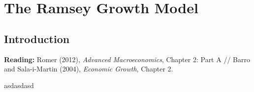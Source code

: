 \chapter{The Ramsey Growth Model}

\section{Introduction}

\textbf{Reading:} Romer (2012), \textit{Advanced Macroeconomics}, Chapter 2: Part A // Barro and Sala-i-Martin (2004), \textit{Economic Growth}, Chapter 2.\\


\begin{defi}
    asdasdasd
\end{defi}
